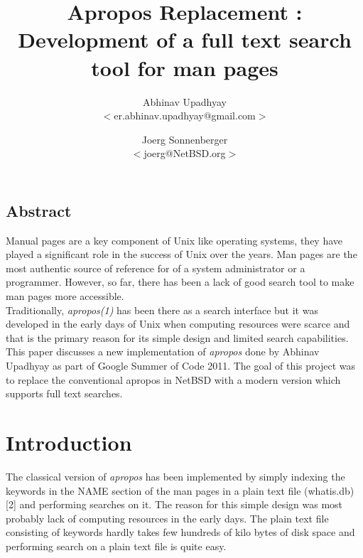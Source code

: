 \documentclass[letterpaper,twocolumn,10pt]{article}
\begin{document}
\date{}

\title{\Large \bf Apropos Replacement : Development of a full text search tool for man pages}

\author{
{\rm Abhinav Upadhyay}\\
$<$er.abhinav.upadhyay@gmail.com$>$
\and
{\rm Joerg Sonnenberger}\\
$<$joerg@NetBSD.org$>$
} %

\maketitle

\thispagestyle{empty}

\subsection*{Abstract}
Manual pages are a key component of Unix like operating systems, they have
played a significant role in the success of Unix over the years. Man pages are
the most authentic source of reference for of a system administrator or a
programmer. However, so far, there has been a lack of good search tool to make
man pages more accessible. \\

Traditionally, \textit{apropos(1)} has been there as a search interface but it
was developed in the early days of Unix when computing resources were scarce
and that is the primary reason for its simple design and limited search
capabilities. \\

This paper discusses a new implementation of \textit{apropos} done by
Abhinav Upadhyay as part of
Google Summer of Code 2011. The goal of this project was to replace the
conventional apropos in NetBSD with a modern version which supports full text
searches. \\


\section{Introduction}
The classical version of \textit{apropos} has been implemented by simply
indexing the keywords in the NAME section of the man pages in a plain text file
(whatis.db) [2]
and performing searches on it. The reason for this simple design was most
probably lack of computing resources in the early days. The plain text file
consisting of keywords hardly takes few hundreds of kilo bytes of disk space
and performing search on a plain text file is quite easy. \\
\end{document}

